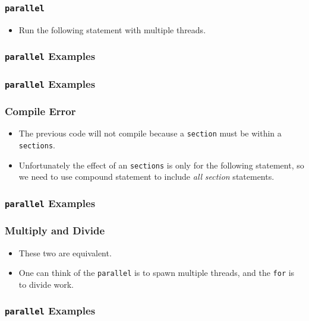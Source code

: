 \documentclass{beamer}
\begin{document}
\begin{frame}
  \frametitle{\tt parallel}
  \begin{itemize}
  \item Run the following statement with multiple threads.
  \end{itemize}
\end{frame}

\begin{frame}
  \frametitle{{\tt parallel} Examples}
\end{frame}

\begin{frame}
  \frametitle{{\tt parallel} Examples}
\end{frame}

\begin{frame}
  \frametitle{Compile Error}
  \begin{itemize}
  \item The previous code will not compile because a {\tt section} must
    be within a {\tt sections}.
  \item Unfortunately the effect of an {\tt sections} is only for the
    following statement, so we need to use compound statement to include
    {\em all} {\em section} statements.
  \end{itemize}
\end{frame}

\begin{frame}
  \frametitle{{\tt parallel} Examples}
\end{frame}

\begin{frame}
  \frametitle{Multiply and Divide}
  \begin{itemize}
  \item These two are equivalent.
  \item One can think of the {\tt parallel} is to spawn multiple threads, and the {\tt for} is to divide work.
  \end{itemize}
\end{frame}

\begin{frame}
  \frametitle{{\tt parallel} Examples}
\end{frame}
\end{document}
